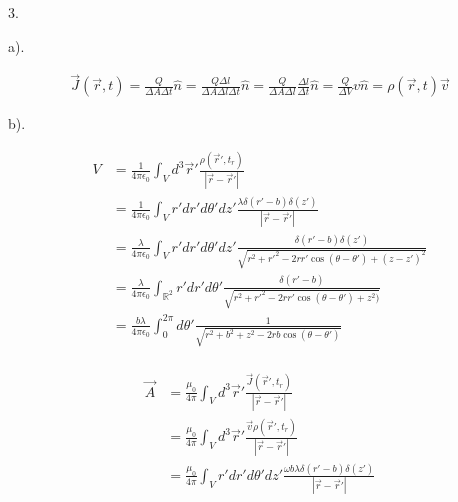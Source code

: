 \documentclass[a4paper,12pt]{article}
\begin{document}
3.
\begin{minipage}[t]{0.9\textwidth}
  a).
  \begin{minipage}[t]{\textwidth}
    \begin{align*}
      \vec{J}(\vec{r}, t) = \frac{Q}{\Delta A \Delta t} \hat n = \frac{Q \Delta l}{\Delta A \Delta l\Delta t} \hat n = \frac{Q}{\Delta A \Delta l}\frac{\Delta l}{\Delta t} \hat n = \frac{Q}{\Delta V}v \hat n = \rho(\vec{r}, t) \vec{v}
    \end{align*}
  \end{minipage}

  b).
  \begin{minipage}[t]{\textwidth}
    \begin{align*}
      V &= \frac{1}{4\pi\epsilon_0} \int_V d^3\vec{r}' \frac{\rho(\vec{r}', t_r)}{|\vec{r}-\vec{r}'|}\\
        &= \frac{1}{4\pi\epsilon_0} \int_V r'dr' d \theta' dz' \frac{\lambda \delta(r' - b) \delta(z')}{|\vec{r}-\vec{r}'|} \\
        &= \frac{\lambda}{4\pi\epsilon_0} \int_V r'dr' d \theta' dz' \frac{ \delta(r' - b) \delta(z')}{\sqrt{r^2 + r'^2 - 2 r r' \cos(\theta - \theta ') + (z - z')^2}} \\
        &= \frac{\lambda }{4\pi\epsilon_0} \int_{\mathbb{R}^2} r'dr' d \theta' \frac{\delta(r' - b) }{\sqrt{r^2 + r'^2 - 2 r r' \cos(\theta - \theta ') + z^2)}} \\
        &= \frac{b \lambda }{4\pi\epsilon_0} \int_0^{2\pi}d \theta' \frac{1}{\sqrt{r^2 + b^2 + z^2- 2 r b \cos(\theta - \theta ')}} \\
    \end{align*}

    \begin{align*}
      \vec{A} &= \frac{\mu_0}{4\pi} \int_V d^3\vec{r}' \frac{\vec{J}(\vec{r}', t_r)}{|\vec{r}-\vec{r}'|}\\
              &= \frac{\mu_0}{4\pi} \int_V d^3\vec{r}' \frac{\vec{v}\rho(\vec{r}', t_r)}{|\vec{r}-\vec{r}'|}\\
        &= \frac{\mu_0}{4\pi} \int_V r'dr' d \theta' dz' \frac{\omega b \lambda \delta(r' - b) \delta(z')}{|\vec{r}-\vec{r}'|} \\
    \end{align*}
  \end{minipage}
\end{minipage}
\end{document}
